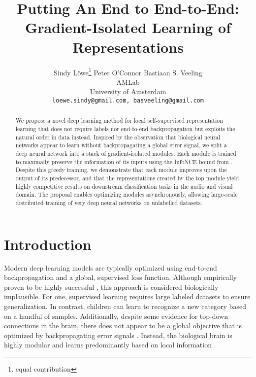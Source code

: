 \documentclass{article}
\title{Putting An End to End-to-End: \\ Gradient-Isolated Learning of Representations}
\author{
    Sindy L\"owe\thanks{equal contribution} \hspace*{2em}Peter O'Connor  \hspace*{2em}Bastiaan S. Veeling \\
    AMLab \\
    University of Amsterdam\\
    \texttt{loewe.sindy@gmail.com, basveeling@gmail.com}\\
}
\begin{document}
\maketitle






\begin{abstract}
We propose a novel deep learning method for local self-supervised representation learning that does not require labels nor end-to-end backpropagation but exploits the natural order in data instead. Inspired by the observation that biological neural networks appear to learn without backpropagating a global error signal, we split a deep neural network into a stack of gradient-isolated modules. Each module is trained to maximally preserve the information of its inputs using the InfoNCE bound from \citet{oord2018representation}. Despite this greedy training, we demonstrate that each module improves upon the output of its predecessor, and that the representations created by the top module yield highly competitive results on downstream classification tasks in the audio and visual domain. The proposal enables optimizing modules asynchronously, allowing large-scale distributed training of very deep neural networks on unlabelled datasets. 




\end{abstract}



\section{Introduction}

Modern deep learning models are typically optimized using end-to-end backpropagation and a global, supervised loss function. Although empirically proven to be highly successful \citep{krizhevsky2012imagenet,szegedy2015going}, 
this approach is considered biologically implausible. For one, supervised learning requires large labeled datasets to ensure generalization. In contrast, children can learn to recognize a new category based on a handful of samples. Additionally, despite some evidence for top-down connections in the brain, there does not appear to be a global objective that is optimized by backpropagating error signals \citep{crick1989recent,marblestone2016toward}. Instead, the biological brain is highly modular and learns predominantly based on local information \citep{caporale2008spike}.
\end{document}
